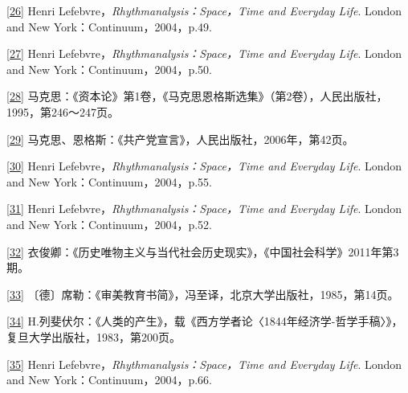 \documentclass[UTF8, fontset = sourcesans, a4paper, oneside, zihao =
-4, scheme=chinese, no-math, space=true]{ctexbook}
\begin{document}
\protect\hypertarget{part0009_split_004.htmlux5cux23m26}{}{}\protect\hyperlink{part0009_split_003.htmlux5cux23w26}{{[}26{]}}
Henri Lefebvre，\emph{Rhythmanalysis：Space，Time and Everyday Life}.
London and New York：Continuum，2004，p.49.

\protect\hypertarget{part0009_split_004.htmlux5cux23m27}{}{}\protect\hyperlink{part0009_split_003.htmlux5cux23w27}{{[}27{]}}
Henri Lefebvre，\emph{Rhythmanalysis：Space，Time and Everyday Life}.
London and New York：Continuum，2004，p.50.

\protect\hypertarget{part0009_split_004.htmlux5cux23m28}{}{}\protect\hyperlink{part0009_split_003.htmlux5cux23w28}{{[}28{]}}
马克思：《资本论》第1卷，《马克思恩格斯选集》（第2卷），人民出版社，1995，第246～247页。

\protect\hypertarget{part0009_split_004.htmlux5cux23m29}{}{}\protect\hyperlink{part0009_split_003.htmlux5cux23w29}{{[}29{]}}
马克思、恩格斯：《共产党宣言》，人民出版社，2006年，第42页。

\protect\hypertarget{part0009_split_004.htmlux5cux23m30}{}{}\protect\hyperlink{part0009_split_003.htmlux5cux23w30}{{[}30{]}}
Henri Lefebvre，\emph{Rhythmanalysis：Space，Time and Everyday Life}.
London and New York：Continuum，2004，p.55.

\protect\hypertarget{part0009_split_004.htmlux5cux23m31}{}{}\protect\hyperlink{part0009_split_003.htmlux5cux23w31}{{[}31{]}}
Henri Lefebvre，\emph{Rhythmanalysis：Space，Time and Everyday Life}.
London and New York：Continuum，2004，p.52.

\protect\hypertarget{part0009_split_004.htmlux5cux23m32}{}{}\protect\hyperlink{part0009_split_004.htmlux5cux23w32}{{[}32{]}}
衣俊卿：《历史唯物主义与当代社会历史现实》，《中国社会科学》2011年第3期。

\protect\hypertarget{part0009_split_004.htmlux5cux23m33}{}{}\protect\hyperlink{part0009_split_004.htmlux5cux23w33}{{[}33{]}}
〔德〕席勒：《审美教育书简》，冯至译，北京大学出版社，1985，第14页。

\protect\hypertarget{part0009_split_004.htmlux5cux23m34}{}{}\protect\hyperlink{part0009_split_004.htmlux5cux23w34}{{[}34{]}}
H.列斐伏尔：《人类的产生》，载《西方学者论〈1844年经济学-哲学手稿〉》，复旦大学出版社，1983，第200页。

\protect\hypertarget{part0009_split_004.htmlux5cux23m35}{}{}\protect\hyperlink{part0009_split_004.htmlux5cux23w35}{{[}35{]}}
Henri Lefebvre，\emph{Rhythmanalysis：Space，Time and Everyday Life}.
London and New York：Continuum，2004，p.66.
\end{document}
